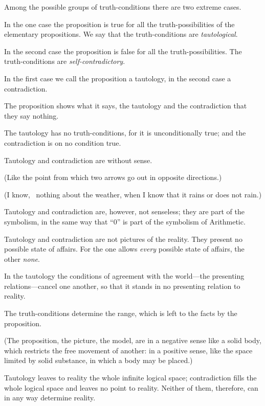 {Among the possible groups of truth-conditions
there are two extreme cases.

In the one case the proposition is true for all the
truth-pos\-si\-bil\-i\-ties of the elementary propositions.
We say that the truth-conditions are \emph{tautological}.

In the second case the proposition is false for all
the truth-pos\-si\-bil\-i\-ties. The truth-conditions are
\emph{self-contradictory}.

In the first case we call the proposition a
tautology, in the second case a contradiction.}


{The proposition shows what it says, the
tautology and the contradiction that they say
nothing.

The tautology has no truth-conditions, for it is
unconditionally true; and the contradiction is on
no condition true.

Tautology and contradiction are without sense.

(Like the point from which two arrows go out in
opposite directions.)

(I know, \exempliGratia\ nothing about the weather, when
I know that it rains or does not rain.)}


{Tautology and contradiction are, however, not
senseless; they are part of the symbolism, in the
same way that ``0'' is part of the symbolism of
Arithmetic.}


{Tautology and contradiction are not pictures of
the reality. They present no possible state of
affairs. For the one allows \emph{every} possible state
of affairs, the other \emph{none}.

In the tautology the conditions of agreement
with the world\AllowBreak---the presenting re\-la\-tions---cancel
one another, so that it stands in no presenting
relation to reality.}


{The truth-conditions determine the range, which
is left to the facts by the proposition.

(The proposition, the picture, the model, are in
a negative sense like a solid body, which restricts
the free movement of another: in a positive sense,
like the space limited by solid substance, in which
a body may be placed.)

Tautology leaves to reality the whole infinite
logical space; contradiction fills the whole logical
space and leaves no point to reality. Neither of
them, therefore, can in any way determine
reality.}


